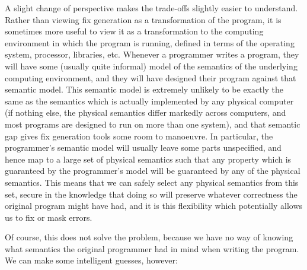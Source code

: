 A slight change of perspective makes the trade-offs slightly easier to
understand.  Rather than viewing fix generation as a transformation of
the program, it is sometimes more useful to view it as a
transformation to the computing environment in which the program is
running, defined in terms of the operating system, processor,
libraries, etc.  Whenever a programmer writes a program, they will
have some (usually quite informal) model of the semantics of the
underlying computing environment, and they will have designed their
program against that semantic model.  This semantic model is extremely
unlikely to be exactly the same as the semantics which is actually
implemented by any physical computer (if nothing else, the physical
semantics differ markedly across computers, and most programs are
designed to run on more than one system), and that semantic gap gives
fix generation tools some room to manoeuvre.  In particular, the
programmer's semantic model will usually leave some parts unspecified,
and hence map to a large set of physical semantics such that any
property which is guaranteed by the programmer's model will be
guaranteed by any of the physical semantics.  This means that we can
safely select any physical semantics from this set, secure in the
knowledge that doing so will preserve whatever correctness the
original program might have had, and it is this flexibility which
potentially allows us to fix or mask errors.

Of course, this does not solve the problem, because we have no way of
knowing what semantics the original programmer had in mind when
writing the program.  We can make some intelligent guesses, however:

